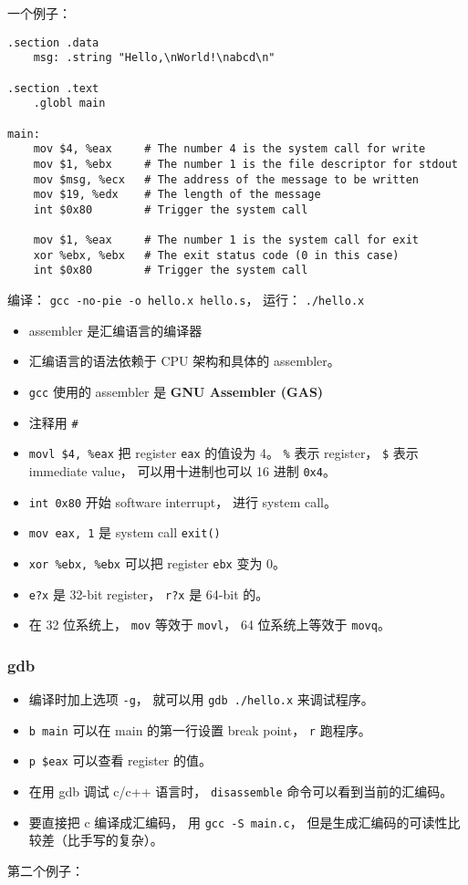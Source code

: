 
\begin{issues}
\issueDraft
\end{issues}

一个例子：
\begin{lstlisting}[language=none]
.section .data
    msg: .string "Hello,\nWorld!\nabcd\n"

.section .text
    .globl main

main:
    mov $4, %eax     # The number 4 is the system call for write
    mov $1, %ebx     # The number 1 is the file descriptor for stdout
    mov $msg, %ecx   # The address of the message to be written
    mov $19, %edx    # The length of the message
    int $0x80        # Trigger the system call

    mov $1, %eax     # The number 1 is the system call for exit
    xor %ebx, %ebx   # The exit status code (0 in this case)
    int $0x80        # Trigger the system call
\end{lstlisting}

编译： \verb|gcc -no-pie -o hello.x hello.s|， 运行： \verb|./hello.x|

\begin{itemize}
\item assembler 是汇编语言的编译器
\item 汇编语言的语法依赖于 CPU 架构和具体的 assembler。
\item \verb|gcc| 使用的 assembler 是 \textbf{GNU Assembler (GAS)}
\item 注释用 \verb|#|
\item \verb|movl $4, %eax| 把 register \verb|eax| 的值设为 4。 \verb|%| 表示 register， \verb|$| 表示 immediate value， 可以用十进制也可以 16 进制 \verb|0x4|。
\item \verb|int 0x80| 开始 software interrupt， 进行 system call。
\item \verb|mov eax, 1| 是 system call \verb|exit()|
\item \verb|xor %ebx, %ebx| 可以把 register \verb|ebx| 变为 0。
\item \verb|e?x| 是 32-bit register， \verb|r?x| 是 64-bit 的。
\item 在 32 位系统上， \verb|mov| 等效于 \verb|movl|， 64 位系统上等效于 \verb|movq|。
\end{itemize}

\subsubsection{gdb}
\begin{itemize}
\item 编译时加上选项 \verb|-g|， 就可以用 \verb|gdb ./hello.x| 来调试程序。
\item \verb|b main| 可以在 main 的第一行设置 break point， \verb|r| 跑程序。
\item \verb|p $eax| 可以查看 register 的值。
\item 在用 gdb 调试 c/c++ 语言时， \verb|disassemble| 命令可以看到当前的汇编码。
\item 要直接把 c 编译成汇编码， 用 \verb|gcc -S main.c|， 但是生成汇编码的可读性比较差（比手写的复杂）。
\end{itemize}


第二个例子：

